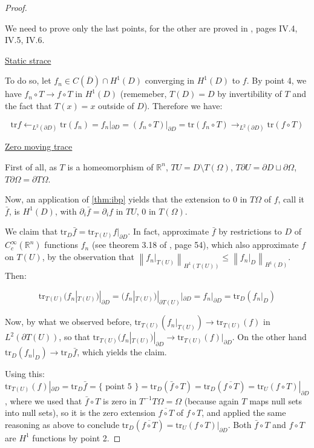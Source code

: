 \documentclass[english,a4paper,10pt,oneside]{scrbook}	%
\theoremstyle{break}
\newenvironment{mproof}[1][\proofname]{%
  \begin{proof}[#1]$ $\par\nobreak\ignorespaces
}{%
  \end{proof}
}
\renewcommand*{\proofname}{Proof}
\theoremstyle{remark}
\newcommand{\mR}{\mathbb{R}}
\newcommand{\norm}[1]{\left\lVert#1\right\rVert}
\newcommand{\tr}{\text{tr}}
\newcommand{\ind}[1]{\{\text{ #1 }\}}
\begin{document}
\begin{mproof}

We need to prove only the last points, for the other are proved in \cite{murat}, pages IV.4, IV.5, IV.6.

\underline{Static strace}

To do so, let $f_n \in C(\overline{D})\cap H^1(D)$ converging in $H^1(D)$ to $f$. By point 4, we have $f_n \circ T\rightarrow f\circ T$ in $H^1(D)$ (rememeber, $T(D)=D$ by invertibility of $T$ and the fact that $T(x)=x$ outside of $D$). Therefore we have:

$$\tr f \leftarrow_{L^2(\partial D)}\tr(f_n) = f_n|_{\partial D} = (f_n\circ T)|_{\partial D}= \tr(f_n \circ T)\rightarrow_{L^2(\partial D)} \tr(f \circ T)$$

\underline{Zero moving trace}

First of all, as $T$ is a homeomorphism of $\mR^{n}$, $TU=D\setminus T(\Omega)$, $T\partial U = \partial D \sqcup \partial \Omega$, $T\partial \Omega = \partial T \Omega$.

Now, an application of \cref{thm:ibp} yields that the extension to $0$ in $T\Omega$ of $f$, call it $\bar{f}$, is $H^1(D)$, with $\partial_i \bar{f}=\partial_i f$ in $TU$, $0$ in $T(\Omega)$.

We claim that $\tr_D \bar{f} = \tr_{T(U)} f|_{\partial D}$. In fact, approximate $\bar{f}$ by restrictions to $D$ of $C^\infty_c(\mR^n)$ functions $f_n$ (see theorem 3.18 of \cite{adams}, page 54), which also approximate $f$ on ${T(U)}$, by the observation that $\norm{f_n|_{T(U)}}_{H^1({T(U)})}\leq \norm{f_n|_D}_{H^1(D)}$. Then:

$$\tr_{T(U)}( f_n|_{T(U)})|_{\partial D} = (f_n|_{T(U)})|_{\partial {T(U)}}|_{\partial D} = f_n|_{\partial D} = \tr_D ( f_n|_D ) $$

Now, by what we observed before, $\tr_{T(U)}( f_n|_{T(U)})\rightarrow \tr_{T(U)}(f) $ in $L^2(\partial {T(U)})$, so that $\tr_{T(U)}( f_n|_{T(U)})|_{\partial D} \rightarrow \tr_{T(U)}( f)|_{\partial D}$. On the other hand $\tr_D ( f_n|_D ) \rightarrow \tr_D \bar{f}$, which yields the claim.

Using this: $ \tr_{T(U)}( f)|_{\partial D} = \tr_D \bar{f} = \ind{point 5} = \tr_D(\bar{f}\circ T) = \tr_D(\overline{f \circ T}) = \tr_U (f\circ T)|_{\partial D}$, where we used that $\bar{f}\circ T$ is zero in $T^{-1}T\Omega = \Omega$ (because again $T$ maps null sets into null sets), so it is the zero extension $\overline{f \circ T}$ of $f\circ T$, and applied the same reasoning as above to conclude $\tr_D(\overline{f \circ T}) = \tr_U (f\circ T)|_{\partial D}$. Both $\bar{f}\circ T$ and $f\circ T$ are $H^1$ functions by point 2.


\end{mproof}
\end{document}
